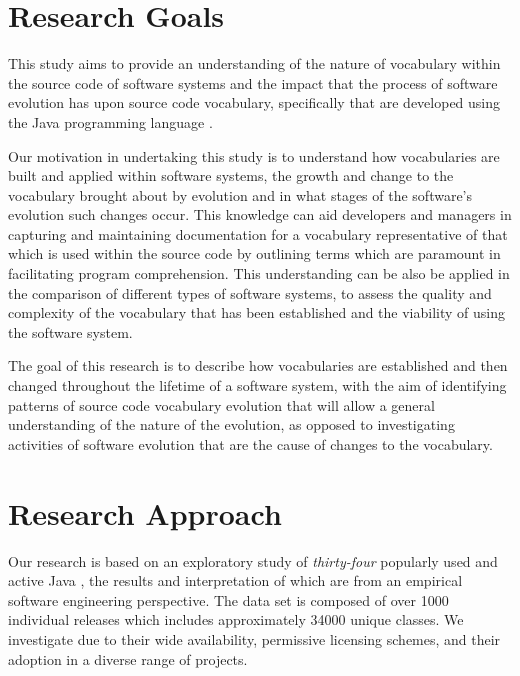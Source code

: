 \section{Research Goals} %
\label{sec:research_goals}

This study aims to provide an understanding of the nature of vocabulary within the source code of software systems and the impact that the process of software evolution has upon source code vocabulary, specifically \OSYS that are developed using the Java programming language \cite{Gosling00a}.

Our motivation in undertaking this study is to understand how vocabularies are built and applied within software systems, the growth and change to the vocabulary brought about by evolution and in what stages of the software's evolution such changes occur. This knowledge can aid developers and managers in capturing and maintaining documentation for a vocabulary representative of that which is used within the source code by outlining terms which are paramount in facilitating program comprehension. This understanding can be also be applied in the comparison of different types of software systems, to assess the quality and complexity of the vocabulary that has been established and the viability of using the software system.

The goal of this research is to describe how vocabularies are established and then changed throughout the lifetime of a software system, with the aim of identifying patterns of source code vocabulary evolution that will allow a general understanding of the nature of the evolution, as opposed to investigating activities of software evolution that are the cause of changes to the vocabulary.


\section{Research Approach} %
\label{sec:research_approach}

Our research is based on an exploratory study of \emph{thirty-four} popularly used and active Java \OSYS, the results and interpretation of which are from an empirical software engineering perspective. The data set is composed of over 1000 individual releases which includes approximately 34000 unique classes. We investigate \OSYS due to their wide availability, permissive licensing schemes, and their adoption in a diverse range of projects.

